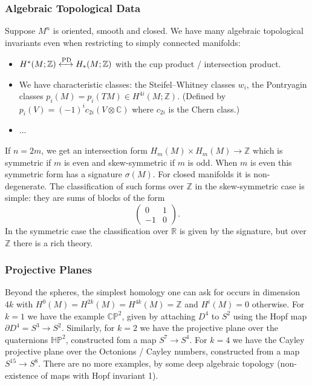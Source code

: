 \documentclass{article}
\theoremstyle{definition}
\newcommand{\PD}{\mathrm{PD}}
\newcommand{\CP}{\mathbb{CP}}
\newcommand{\HP}{\mathbb{HP}}
\newcommand{\Z}{\mathbb{Z}}
\newcommand{\R}{\mathbb{R}}
\newcommand{\C}{\mathbb{C}}
\begin{document}
\subsubsection*{Algebraic Topological Data}

Suppose $M^n$ is oriented, smooth and closed. We have many algebraic topological
invariants even when restricting to simply connected manifolds:
\begin{itemize}
    \item $H^*(M;\Z)\xleftrightarrow{\PD}H_*(M;\Z)$ with the cup product /
        intersection product.

    \item We have characteristic classes: the Steifel--Whitney classes $w_i$,
        the Pontryagin classes $p_i(M)=p_i(TM)\in H^{4i}(M;\Z)$. (Defined by
        $p_i(V)=(-1)^ic_{2i}(V\otimes\C)$ where $c_{2i}$ is the Chern class.)

    \item ...
\end{itemize}
If $n=2m$, we get an intersection form $H_m(M)\times H_m(M)\to\Z$ which is
symmetric if $m$ is even and skew-symmetric if $m$ is odd. When $m$ is even this
symmetric form has a signature $\sigma(M)$. For closed manifolds it is
non-degenerate.
The classification of such forms over $\Z$ in the skew-symmetric case is simple:
they are sums of blocks of the form
\begin{equation*}
    \begin{pmatrix}
        0 & 1 \\ -1 & 0
    \end{pmatrix}.
\end{equation*}
In the symmetric case the classification over $\R$ is given by the signature,
but over $\Z$ there is a rich theory.

\subsubsection*{Projective Planes}

Beyond the spheres, the simplest homology one can ask for occurs in dimension
$4k$ with $H^0(M)=H^{2k}(M)=H^{4k}(M)=\Z$ and $H^i(M)=0$ otherwise. For $k=1$ we
have the example $\CP^2$, given by attaching $D^4$ to $S^2$ using the Hopf map
$\partial D^4=S^3\to S^2$. Similarly, for $k=2$ we have the projective plane
over the quaternions $\HP^2$, constructed fom a map $S^7\to S^4$. For $k=4$ we
have the Cayley projective plane over the Octonions / Cayley numbers,
constructed from a map $S^{15}\to S^8$. There are no more examples, by some deep
algebraic topology (non-existence of maps with Hopf invariant 1).
\end{document}
